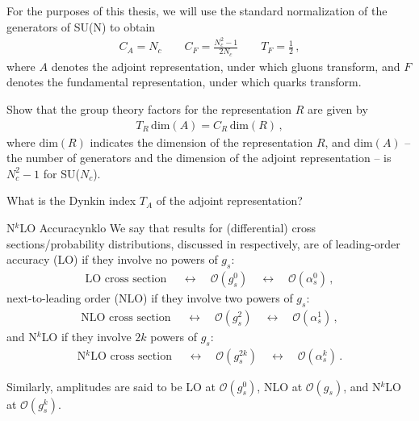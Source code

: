 For the purposes of this thesis, we will use the standard normalization of the generators of SU(N) to obtain
\begin{align}
    C_A = N_c
    \qquad
    C_F = \frac{N_c^2 - 1}{2 N_c}
    \qquad
    T_F = \frac{1}{2}
    \,,
\end{align}
where \(A\) denotes the adjoint representation, under which gluons transform, and \(F\) denotes the fundamental representation, under which quarks transform.

\begin{exercise}
    \label{ex:group-theory-factors}
    Show that the group theory factors for the representation \(R\) are given by
    \begin{align}
        T_R \, \text{dim}(A)
        =
        C_R \, \text{dim}(R)
        \,,
    \end{align}
    where \(\text{dim}(R)\) indicates the dimension of the representation \(R\), and \(\text{dim}(A)\) -- the number of generators and the dimension of the adjoint representation -- is \(N_c^2 - 1\) for SU(\(N_c\)).

    What is the Dynkin index \(T_A\) of the adjoint representation?
\end{exercise}




\begin{definitionbox}{N\(^k\)LO Accuracy}{nklo}
    We say that results for (differential) cross sections/probability distributions, discussed in  respectively, are of leading-order accuracy (LO) if they involve no powers of \(g_s\):
    \begin{align}
        \text{LO cross section }
        \quad \leftrightarrow \quad
        \mathcal{O}(g_s^{0})
        \quad \leftrightarrow \quad
        \mathcal{O}(\alpha_s^0)
        \,,
    \end{align}
    next-to-leading order (NLO) if they involve two powers of \(g_s\):
    \begin{align}
        \text{NLO cross section }
        \quad \leftrightarrow \quad
        \mathcal{O}(g_s^{2})
        \quad \leftrightarrow \quad
        \mathcal{O}(\alpha_s^1)
        \,,
    \end{align}
    and N\(^k\)LO if they involve \(2k\) powers of \(g_s\):
    \begin{align}
        \text{N\(^k\)LO cross section }
        \quad \leftrightarrow \quad
        \mathcal{O}(g_s^{2k})
        \quad \leftrightarrow \quad
        \mathcal{O}(\alpha_s^k)
        \,.
    \end{align}

    Similarly, amplitudes are said to be LO at \(\mathcal{O}(g_s^0)\), NLO at \(\mathcal{O}(g_s)\), and N\(^k\)LO at \(\mathcal{O}(g_s^k)\).
\end{definitionbox}


